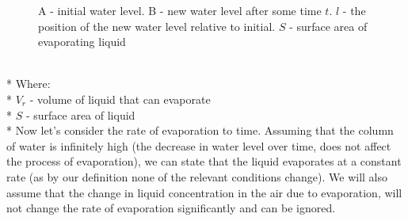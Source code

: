 \documentclass[12pt,letterpaper,final]{report}
\begin{document}
\begin{figure}
\begin{center}
\vspace{-2 cm}
\end{center} 
\caption{A - initial water level. B - new water level after some time $t$. $l$ - the position of the new water level relative to initial. $S$ - surface area of evaporating liquid}\label{fig:ev}
\end{figure}
\\* Where: 
\medskip
\\* $V_{r}$ - volume of liquid that can evaporate
\\* $S$ - surface area of liquid
\medskip
\\* Now let's consider the rate of evaporation to time. Assuming that the column of water is infinitely high (the decrease in water level over time, does not affect the process of evaporation), we can state that the liquid evaporates at a constant rate (as by our definition none of the relevant conditions change). We will also assume that the change in liquid concentration in the air due to evaporation, will not change the rate of evaporation significantly and can be ignored.
\end{document}
